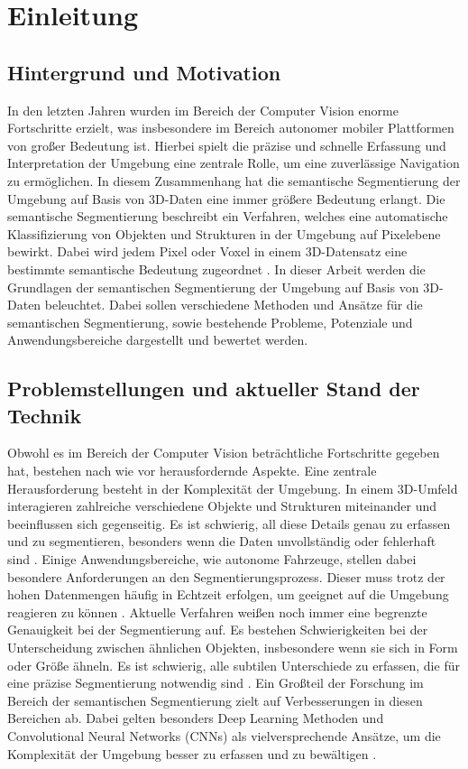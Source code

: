 \chapter{Einleitung}

\section{Hintergrund und Motivation}

In den letzten Jahren wurden im Bereich der Computer Vision enorme Fortschritte
erzielt, was insbesondere im Bereich autonomer mobiler Plattformen von großer
Bedeutung ist. Hierbei spielt die präzise und schnelle Erfassung und
Interpretation der Umgebung eine zentrale Rolle, um eine zuverlässige
Navigation zu ermöglichen. In diesem Zusammenhang hat die semantische
Segmentierung der Umgebung auf Basis von 3D-Daten eine immer größere Bedeutung
erlangt. Die semantische Segmentierung beschreibt ein Verfahren, welches eine
automatische Klassifizierung von Objekten und Strukturen in der Umgebung auf
Pixelebene bewirkt. Dabei wird jedem Pixel oder Voxel in einem 3D-Datensatz
eine bestimmte semantische Bedeutung zugeordnet \cite{CGV-079}. In dieser
Arbeit werden die Grundlagen der semantischen Segmentierung der Umgebung auf
Basis von 3D-Daten beleuchtet. Dabei sollen verschiedene Methoden und Ansätze
für die semantischen Segmentierung, sowie bestehende Probleme, Potenziale und
Anwendungsbereiche dargestellt und bewertet werden.\cite{9102769}

\section{Problemstellungen und aktueller Stand der Technik}

Obwohl es im Bereich der Computer Vision beträchtliche Fortschritte gegeben
hat, bestehen nach wie vor herausfordernde Aspekte. Eine zentrale
Herausforderung besteht in der Komplexität der Umgebung. In einem 3D-Umfeld
interagieren zahlreiche verschiedene Objekte und Strukturen miteinander und
beeinflussen sich gegenseitig. Es ist schwierig, all diese Details genau zu
erfassen und zu segmentieren, besonders wenn die Daten unvollständig oder
fehlerhaft sind \cite{CGV-079}. Einige Anwendungsbereiche, wie autonome
Fahrzeuge, stellen dabei besondere Anforderungen an den Segmentierungsprozess.
Dieser muss trotz der hohen Datenmengen häufig in Echtzeit erfolgen, um
geeignet auf die Umgebung reagieren zu können \cite{8206396}. Aktuelle
Verfahren weißen noch immer eine begrenzte Genauigkeit bei der Segmentierung
auf. Es bestehen Schwierigkeiten bei der Unterscheidung zwischen
ähnlichen Objekten, insbesondere wenn sie sich in Form oder Größe ähneln. Es
ist schwierig, alle subtilen Unterschiede zu erfassen, die für eine präzise
Segmentierung notwendig sind \cite{9420573}. Ein Großteil der Forschung im
Bereich der semantischen Segmentierung zielt auf Verbesserungen in diesen
Bereichen ab. Dabei gelten besonders Deep Learning Methoden und Convolutional
Neural Networks (CNNs) als vielversprechende Ansätze, um die Komplexität der
Umgebung besser zu erfassen und zu bewältigen \cite{9423307,8100085}.